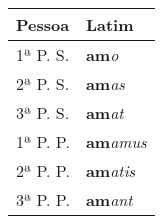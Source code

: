 \documentclass{book}
\begin{document}
\begin{table}
\centering
\begin{tabular}{l|l}
\hline
Pessoa & Latim \\ 		%
\hline                                    		%
1ª P. S.	&  \textbf{am}\textit{o} \\
2ª P. S.	&  \textbf{am}\textit{as} \\
3ª P. S.	&  \textbf{am}\textit{at} \\
1ª P. P.	& \textbf{am}\textit{amus} \\
2ª P. P. 	&  \textbf{am}\textit{atis} \\
3ª P. P.	&  \textbf{am}\textit{ant} \\ \hline
\end{tabular}
\end{table}
\end{document}

